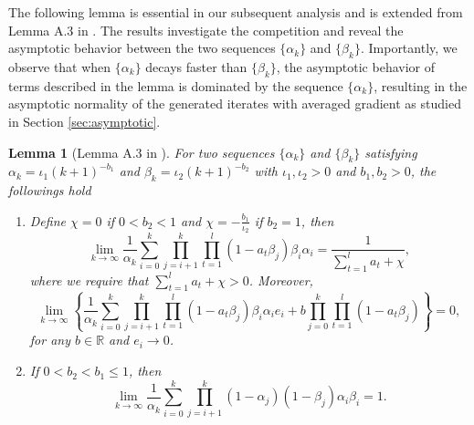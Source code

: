 \documentclass[aos]{imsart}
\numberwithin{equation}{section}
\theoremstyle{plain}
\newtheorem{lemma}{Lemma}
\begin{document}
\begin{appendix}
The following lemma is essential in our subsequent analysis and is extended from Lemma A.3 in \cite{na2022asymptotic}. The results investigate the competition and reveal the asymptotic behavior between the two sequences $\{\alpha_{k}\}$ and $\{\beta_{k}\}$. Importantly, we observe that when $\{\alpha_{k}\}$ decays faster than $\{\beta_{k}\}$, the asymptotic behavior of terms described in the lemma is dominated by the sequence $\{\alpha_{k}\}$, resulting in the asymptotic normality of the generated iterates with averaged gradient as studied in Section \ref{sec:asymptotic}. 
\begin{lemma}
    [Lemma A.3 in \cite{na2022asymptotic}]
    \label{lemma_tool}
    For two sequences $\{\alpha_{k}\}$ and $\{\beta_{k}\}$ satisfying $\alpha_k = \iota_1 (k+1)^{-b_1}$ and $\beta_k = \iota_2 (k+1)^{-b_2}$ with $\iota_1, \iota_2 >0$ and $b_1, b_2 > 0$, the followings hold 
    \begin{enumerate}
        \item Define $\chi = 0$ if $0 < b_2 < 1$ and $\chi = -\frac{b_1}{\iota_2}$ if $b_2 = 1$, then
         \begin{equation*}
            \lim_{k \to \infty} \frac{1}{\alpha_k} \sum_{i=0}^{k} \prod_{j=i+1}^{k} \prod_{t = 1}^{l} \left( 1 - a_{t} \beta_{j} \right) \beta_{i} \alpha_{i} =  \frac{1}{\sum_{t=1}^{l} a_t + \chi},
        \end{equation*}
        where we require that $\sum_{t=1}^{l} a_t + \chi> 0$. Moreover,
        \begin{equation*}
            \lim_{k \to \infty} \left\{\frac{1}{\alpha_k} \sum_{i=0}^{k} \prod_{j=i+1}^{k} \prod_{t = 1}^{l} \left( 1 - a_{t} \beta_{j} \right) \beta_{i} \alpha_{i} e_{i} + b \prod_{j=0}^{k} \prod_{t = 1}^{l} \left( 1 - a_{t} \beta_{j} \right) \right\} = 0,
        \end{equation*}
        for any $b \in \mathbb{R}$ and $e_{i} \to 0$.

        \item If $0 < b_2 < b_1 \leq 1$, then 
        \begin{equation*}
            \lim_{k \to \infty} \frac{1}{\alpha_k}  \sum_{i=0}^{k} \prod_{j=i+1}^{k} \left( 1 - \alpha_j \right) \left( 1 - \beta_j \right) \alpha_i \beta_i = 1.
        \end{equation*}
        
    \end{enumerate}
\end{lemma}



\end{appendix}
\end{document}
